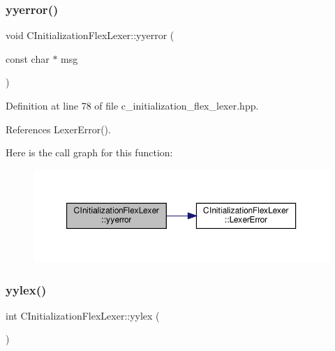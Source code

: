 \subsubsection{\texorpdfstring{yyerror()}{yyerror()}}
{\footnotesize\ttfamily void C\+Initialization\+Flex\+Lexer\+::yyerror (\begin{DoxyParamCaption}\item[{const char $\ast$}]{msg }\end{DoxyParamCaption})\hspace{0.3cm}{\ttfamily [inline]}}



Definition at line 78 of file c\+\_\+initialization\+\_\+flex\+\_\+lexer.\+hpp.



References Lexer\+Error().

Here is the call graph for this function\+:
\nopagebreak
\begin{figure}[H]
\begin{center}
\leavevmode
\includegraphics[width=350pt]{de/d8d/classCInitializationFlexLexer_a78b352766a89474e8becb50762c15150_cgraph}
\end{center}
\end{figure}
\mbox{\label{classCInitializationFlexLexer_ac862b7dee91d44d6dd5f8cca14429f10}} 
\subsubsection{\texorpdfstring{yylex()}{yylex()}}
{\footnotesize\ttfamily int C\+Initialization\+Flex\+Lexer\+::yylex (\begin{DoxyParamCaption}{ }\end{DoxyParamCaption})}

\mbox{\label{classCInitializationFlexLexer_a4d73715f8ecba634f7724d62e90a2ca9}} 
